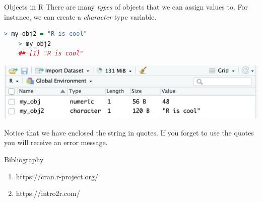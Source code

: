 \documentclass[aspectratio=169,xcolor=dvipsnames]{beamer}
\begin{document}
\begin{frame}[fragile]{Objects in R}
There are many \textit{types} of objects that we can assign values to. For instance, we can create a \textit{character} type variable. \\

\begin{center}
\begin{lstlisting}[language=R]
    > my_obj2 = "R is cool"
    > my_obj2
    ## [1] "R is cool"
    \end{lstlisting}
\end{center}
\begin{center}
\includegraphics[scale=0.4]{images/env_cool.png}
\end{center}
Notice that we have enclosed the string in quotes. If you forget to use the quotes you will receive an error message. \\ 

\end{frame}



\begin{frame}{Bibliography}
\begin{enumerate}
	\item https://cran.r-project.org/
	\item https://intro2r.com/
\end{enumerate}
\end{frame}
\end{document}
